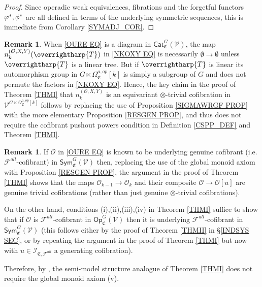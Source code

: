 \documentclass[a4paper,10pt
,draft
]{article}%
\numberwithin{equation}{section}
\numberwithin{figure}{section}
\theoremstyle{definition} %
\newtheorem{remark}[equation]{Remark}%
\newcommand{\vect}[1]{\text{\overrightharp{\ensuremath{#1}}}}
\newcommand{\F}{\ensuremath{\mathcal F}}
\newcommand{\V}{\ensuremath{\mathcal V}}
\renewcommand{\O}{\ensuremath{\mathcal O}}
\newcommand{\1}{\ensuremath{\mathbbm 1}}%
\begin{document}
\begin{proof}
	Since operadic weak equivalences, fibrations and the forgetful functors $\varphi^{\**},\phi^{\**}$
	are all defined in terms of the underlying symmetric sequences,
	this is immediate from Corollary \ref{SYMADJ_COR}.
\end{proof}






\begin{remark}\label{CSPNTHI REM}
When \eqref{OURE EQ}
is a diagram in $\mathsf{Cat}^G_{\mathfrak{C}}(\V)$, 
the map 
$n_k^{(\mathcal{O},X,Y)}(\vect{T})$
in \eqref{NKOXY EQ}
is necessarily $\emptyset \to \emptyset$
unless $\vect{T}$ is a linear tree.
But if $\vect{T}$ is linear
its automorphism group in 
$G \ltimes \Omega_{\mathfrak{C}}^{a,op}[k]$
is simply a subgroup of $G$
and does not permute the factors in \eqref{NKOXY EQ}.
Hence, the key claim in the proof of Theorem \ref{THMI} that 
$n_k^{(\mathcal{O},X,Y)}$
is an equivariant $\otimes$-trivial cofibration in
$\V^{G \ltimes \Omega_{\mathfrak{C}}^{a,op}[k]}$
follows by replacing the use of Proposition \ref{SIGMAWRGF PROP}
with the more elementary
Proposition \ref{RESGEN PROP},
and thus does not require
the cofibrant pushout powers condition
in Definition \ref{CSPP_DEF} and Theorem \ref{THMI}.
\end{remark}




\begin{remark}\label{THMISM REM}
	If $\O$ in \eqref{OURE EQ}
	is known to be underlying genuine cofibrant
	(i.e. $\F^{all}$-cofibrant) in 
	$\mathsf{Sym}^{G}_{\mathfrak{C}}(\V)$ 
	then, replacing the use of the global monoid axiom with 
	Proposition \ref{RESGEN PROP},
	the argument in the proof of Theorem \ref{THMI}
	shows that the maps
	$\O_{k-1} \to \O_k$
	and their composite
	$\O \to \O[u]$
	are genuine trivial cofibrations
	(rather than just genuine $\otimes$-trivial cofibrations).
	
	On the other hand, conditions (i),(ii),(iii),(iv) in Theorem \ref{THMI}
	suffice to show that if $\O$ is $\mathcal{F}^{all}$-cofibrant in 
	$\mathsf{Op}^G_{\mathfrak{C}}(\V)$
	then it is underlying $\mathcal{F}^{all}$-cofibrant in 
	$\mathsf{Sym}^G_{\mathfrak{C}}(\V)$
	(this follows either by the proof of Theorem \ref{THMII} in \S \ref{INDSYS SEC},
	or by repeating the argument in the proof of Theorem \ref{THMI} but now with $u \in \mathcal{I}_{\mathfrak{C},\F^{all}}$
	a generating cofibration).
	
	Therefore, by \cite[Thm. 2.2.2]{WY18},
	the semi-model structure analogue of Theorem \ref{THMI}
	does not require the global monoid axiom (v).
\end{remark}
  
\end{document}
